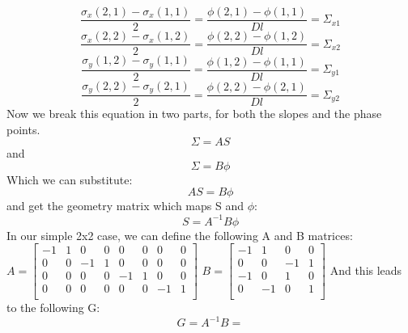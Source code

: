 \documentclass{article}
\begin{document}
$$ \frac{\sigma_x(2,1)-\sigma_x(1,1)}{2} = \frac{\phi(2,1)-\phi(1,1)}{Dl} = \varSigma_{x1}$$
$$ \frac{\sigma_x(2,2)-\sigma_x(1,2)}{2} = \frac{\phi(2,2)-\phi(1,2)}{Dl} = \varSigma_{x2}$$
$$ \frac{\sigma_y(1,2)-\sigma_y(1,1)}{2} = \frac{\phi(1,2)-\phi(1,1)}{Dl} = \varSigma_{y1}$$
$$ \frac{\sigma_y(2,2)-\sigma_y(2,1)}{2} = \frac{\phi(2,2)-\phi(2,1)}{Dl} = \varSigma_{y2}$$
Now we break this equation in two parts, for both the slopes and the phase points.
$$ \varSigma = AS$$
and
$$ \varSigma = B\phi$$ 
Which we can substitute:
$$ AS = B\phi $$
and get the geometry matrix which maps S and $\phi$:
$$ S = A^{-1}B\phi $$
In our simple 2x2 case, we can define the following A and B matrices:
\newline
\newline
$ A=
\begin{bmatrix}
-1 & 1 & 0 & 0 & 0 & 0 & 0 & 0  \\
 0 & 0 & -1& 1 & 0 & 0 & 0 & 0  \\
 0 & 0 & 0 & 0 & -1& 1 & 0 & 0  \\
 0 & 0 & 0 & 0 & 0 & 0 & -1& 1  \\
\end{bmatrix}
$
$
B = 
\begin{bmatrix}
-1 & 1 & 0 & 0 \\
 0 & 0 & -1& 1 \\
-1 & 0 & 1 & 0 \\
 0 & -1& 0 & 1 \\
\end{bmatrix}
$
\newline
\newline
And this leads to the following G:
$$
G = A^{-1}B = 
$$
\end{document}
